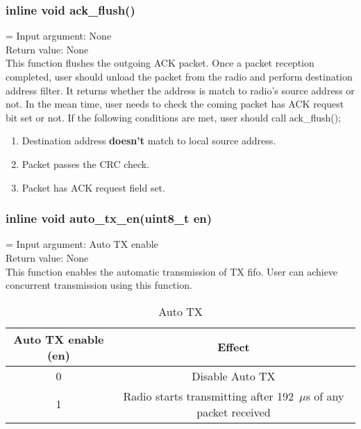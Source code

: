 \subsubsection{inline void ack\_flush()}
\hangindent=\parindent
{}
Input argument: None\\
Return value: None\\
This function flushes the outgoing ACK packet. Once a packet reception completed, user should
unload the packet from the radio and perform destination address filter. It returns whether
the address is match to radio's source address or not. In the mean time, user needs to check
the coming packet has ACK request bit set or not. If the following conditions are met, user
should call ack\_flush();
\begin{enumerate}
	\item Destination address {\bf doesn't} match to local source address.
	\item Packet passes the CRC check.
	\item Packet has ACK request field set.
\end{enumerate}

\subsubsection{inline void auto\_tx\_en(uint8\_t en)}
\hangindent=\parindent
{}
Input argument: Auto TX enable\\
Return value: None\\
This function enables the automatic transmission of TX fifo. User can achieve concurrent
transmission using this function.
\begin{table}[h]
\centering
	\begin{tabular}{|c|c|}
	\hline
		{\bf Auto TX enable (en)} & {\bf Effect}\\ \hline
		0 & Disable Auto TX\\ \hline
		1 & Radio starts transmitting after 192~$\mu$s of any packet received\\ \hline
	\end{tabular}
	\caption{Auto TX}
\end{table}

